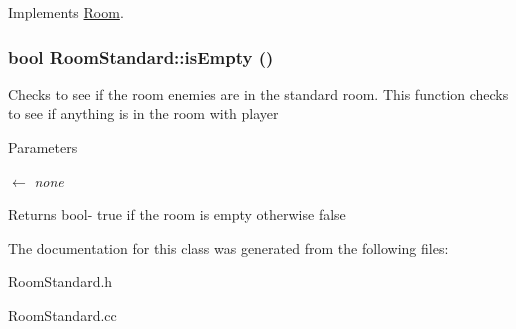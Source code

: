 Implements \hyperlink{classRoom_aacf839325fa7c6b08d21533b0780025c}{Room}.\hypertarget{classRoomStandard_a5a9c448abac066bd2fe69e5b1d20d4e8}{
\subsubsection[{isEmpty}]{\setlength{\rightskip}{0pt plus 5cm}bool RoomStandard::isEmpty ()}}
\label{classRoomStandard_a5a9c448abac066bd2fe69e5b1d20d4e8}


Checks to see if the room enemies are in the standard room. This function checks to see if anything is in the room with player 
\begin{DoxyParams}{Parameters}
\item[\mbox{$\leftarrow$} {\em none}]\end{DoxyParams}
\begin{DoxyReturn}{Returns}
bool-\/ true if the room is empty otherwise false 
\end{DoxyReturn}


The documentation for this class was generated from the following files:\begin{DoxyCompactItemize}
\item 
RoomStandard.h\item 
RoomStandard.cc\end{DoxyCompactItemize}

